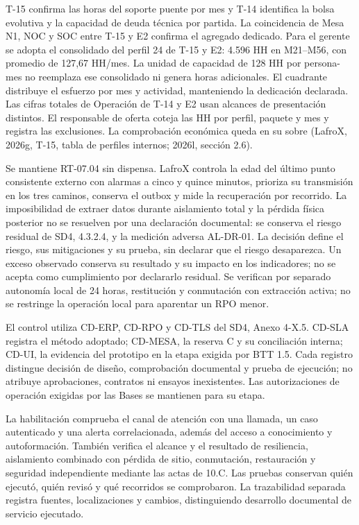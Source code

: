 \begin{description}[style=nextline,leftmargin=0pt,labelwidth=0pt,labelsep=0pt,font=\normalfont\intersemibold]
\item[B-10. Conciliación de capacidad técnica y económica.]
T-15 confirma las horas del soporte puente por mes y T-14 identifica la bolsa evolutiva y la capacidad de deuda técnica por partida. La coincidencia de Mesa N1, NOC y SOC entre T-15 y E2 confirma el agregado dedicado. Para el gerente se adopta el consolidado del perfil 24 de T-15 y E2: 4.596 HH en M21--M56, con promedio de 127,67 HH/mes. La unidad de capacidad de 128 HH por persona-mes no reemplaza ese consolidado ni genera horas adicionales. El cuadrante distribuye el esfuerzo por mes y actividad, manteniendo la dedicación declarada. Las cifras totales de Operación de T-14 y E2 usan alcances de presentación distintos. El responsable de oferta coteja las HH por perfil, paquete y mes y registra las exclusiones. La comprobación económica queda en su sobre (LafroX, 2026g, T-15, tabla de perfiles internos; 2026l, sección 2.6).
\Needspace{0.18\textheight}
\item[B-11. RPO con aislamiento y pérdida del sitio.]
Se mantiene RT-07.04 sin dispensa. LafroX controla la edad del último punto consistente externo con alarmas a cinco y quince minutos, prioriza su transmisión en los tres caminos, conserva el outbox y mide la recuperación por recorrido. La imposibilidad de extraer datos durante aislamiento total y la pérdida física posterior no se resuelven por una declaración documental: se conserva el riesgo residual de SD4, 4.3.2.4, y la medición adversa AL-DR-01. La decisión define el riesgo, sus mitigaciones y su prueba, sin declarar que el riesgo desaparezca. Un exceso observado conserva su resultado y su impacto en los indicadores; no se acepta como cumplimiento por declararlo residual. Se verifican por separado autonomía local de 24 horas, restitución y conmutación con extracción activa; no se restringe la operación local para aparentar un RPO menor.

\end{description}

El control utiliza CD-ERP, CD-RPO y CD-TLS del SD4, Anexo 4-X.5. CD-SLA registra el método adoptado; CD-MESA, la reserva C y su conciliación interna; CD-UI, la evidencia del prototipo en la etapa exigida por BTT 1.5. Cada registro distingue decisión de diseño, comprobación documental y prueba de ejecución; no atribuye aprobaciones, contratos ni ensayos inexistentes. Las autorizaciones de operación exigidas por las Bases se mantienen para su etapa.

La habilitación comprueba el canal de atención con una llamada, un caso autenticado y una alerta correlacionada, además del acceso a conocimiento y autoformación. También verifica el alcance y el resultado de resiliencia, aislamiento combinado con pérdida de sitio, conmutación, restauración y seguridad independiente mediante las actas de 10.C. Las pruebas conservan quién ejecutó, quién revisó y qué recorridos se comprobaron. La trazabilidad separada registra fuentes, localizaciones y cambios, distinguiendo desarrollo documental de servicio ejecutado.

